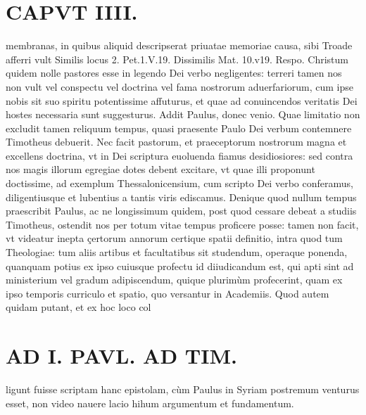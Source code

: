 \documentclass{article}
\begin{document}
\begin{pages}
\section*{CAPVT  IIII. }
\marginpar{[ p.233 ]}\pstart membranas, in quibus aliquid descripserat priuatae memoriae causa, sibi Troade afferri vult Similis locus 2. Pet.1.V.19. Dissimilis Mat. 10.v19. Respo. Christum quidem nolle pastores esse in legendo Dei verbo negligentes: terreri tamen nos non vult vel conspectu vel doctrina vel fama nostrorum aduerfariorum, cum ipse nobis sit suo spiritu potentissime affuturus, et quae ad conuincendos veritatis Dei hostes necessaria sunt suggesturus.  \pend\pstart Addit Paulus, donec venio. Quae limitatio non excludit tamen reliquum tempus, quasi praesente Paulo Dei verbum contemnere Timotheus debuerit. Nec facit pastorum, et praeceptorum nostrorum magna et excellens doctrina, vt in Dei scriptura euoluenda fiamus desidiosiores: sed contra nos magis illorum egregiae dotes debent excitare, vt quae illi proponunt doctissime, ad exemplum Thessalonicensium, cum scripto Dei verbo conferamus, diligentiusque et lubentius a tantis viris ediscamus.  \pend\pstart Denique quod nullum tempus praescribit Paulus, ac ne longissimum quidem, post quod cessare debeat a studiis Timotheus, ostendit nos per totum vitae tempus proficere posse: tamen non facit, vt videatur inepta çertorum annorum certique spatii definitio, intra quod tum Theologiae: tum aliis artibus et facultatibus sit studendum, operaque ponenda, quanquam potius ex ipso cuiusque profectu id diiudicandum est, qui apti sint ad ministerium vel gradum adipiscendum, quique  plurimùm profecerint, quam ex ipso temporis curriculo et spatio, quo versantur in Academiis. Quod autem quidam putant, et ex hoc loco col\pend
\section*{AD I. PAVL. AD TIM. }
\marginpar{[ p.254 ]}\pstart ligunt fuisse scriptam hanc epistolam, cùm Paulus in Syriam postremum venturus esset, non video nauere lacio hihum argumentum et fundamentum.  \pend
{}
{}

\end{pages}
\end{document}
